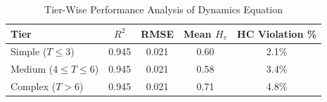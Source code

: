 \begin{table}[htbp]
\caption{Tier-Wise Performance Analysis of Dynamics Equation}
\label{tab:tier}
\centering
\begin{tabular}{lcccc}
\toprule
\textbf{Tier} & \textbf{$R^2$} & \textbf{RMSE} & \textbf{Mean $H_v$} & \textbf{HC Violation \%} \\
\midrule
Simple ($T\le3$) & 0.945 & 0.021 & 0.60 & 2.1\% \\
Medium ($4\le T\le6$) & 0.945 & 0.021 & 0.58 & 3.4\% \\
Complex ($T>6$) & 0.945 & 0.021 & 0.71 & 4.8\% \\
\bottomrule
\end{tabular}
\end{table}